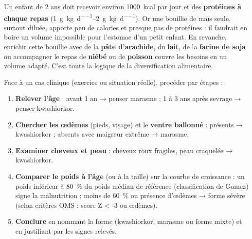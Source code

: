 \documentclass[11pt]{article}
\begin{document}
\begin{exemplebox}
Un enfant de 2 ans doit recevoir environ \SI{1000}{kcal} par jour et des \textbf{protéines à chaque repas} (\SIrange{1}{2}{\gram\per\kilogram\per\day}). Or une bouillie de maïs seule, surtout diluée, apporte peu de calories et presque pas de protéines : il faudrait en boire un volume impossible pour l'estomac d'un petit enfant. En revanche, enrichir cette bouillie avec de la \textbf{pâte d'arachide}, du \textbf{lait}, de la \textbf{farine de soja} ou accompagner le repas de \textbf{niébé} ou de \textbf{poisson} couvre les besoins en un volume adapté. C'est toute la logique de la diversification alimentaire.
\end{exemplebox}

\begin{methode}
Face à un cas clinique (exercice ou situation réelle), procéder par étapes :
\begin{enumerate}
\item \textbf{Relever l'âge} : avant 1 an → penser marasme ; 1 à 3 ans après sevrage → penser kwashiorkor.
\item \textbf{Chercher les œdèmes} (pieds, visage) et le \textbf{ventre ballonné} : présents → kwashiorkor ; absents avec maigreur extrême → marasme.
\item \textbf{Examiner cheveux et peau} : cheveux roux fragiles, peau craquelée → kwashiorkor.
\item \textbf{Comparer le poids à l'âge} (ou à la taille) sur la courbe de croissance : un poids inférieur à \SI{80}{\%} du poids médian de référence (classification de Gomez) signe la malnutrition ; moins de \SI{60}{\%} ou présence d'œdèmes → forme sévère (selon critères OMS : score Z < -3 ou œdèmes).
\item \textbf{Conclure} en nommant la forme (kwashiorkor, marasme ou forme mixte) et en justifiant par les signes relevés.
\end{enumerate}
\end{methode}
\end{document}
